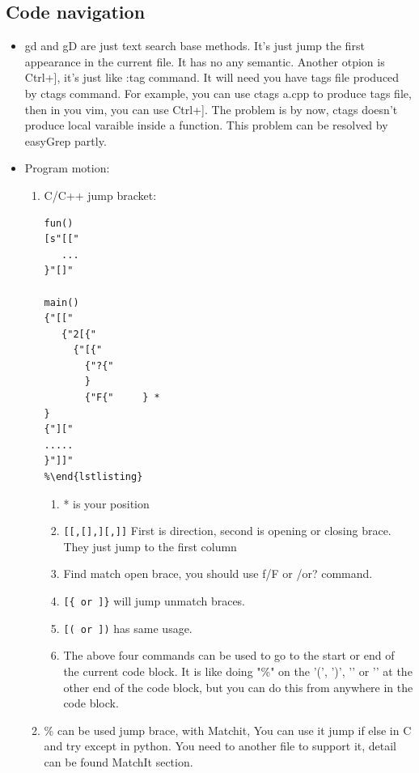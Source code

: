 \documentclass[a4paper,11pt,twoside]{book}
\begin{document}
\subsection{Code navigation}
\begin{itemize}
	\item gd and gD are just text search base methods. It's just jump the first appearance in the current file. It has no any semantic. Another otpion is Ctrl+], it's just like :tag command. It will need you have tags file produced by ctags command. For example, you can use ctags a.cpp to produce tags file, then in you vim, you can use Ctrl+]. The problem is by now, ctags doesn't produce local varaible inside a function.  This problem can be resolved by easyGrep partly.

	\item  Program motion:
\begin{enumerate}
 	\item C/C++ jump bracket:
\begin{verbatim}
fun()
[s"[["
   ...
}"[]"

main()
{"[["
   {"2[{"
	 {"[{" 
	   {"?{"
	   }
	   {"F{"     } *
}
{"]["
.....
}"]]"
%\end{lstlisting}
\end{verbatim}

\begin{enumerate}
		\item * is your position
		\item \verb=[[,[],][,]]= First is direction, second is opening or closing brace. They just jump to the first column
		\item Find match open brace, you should use f/F or /or? command. 
		\item \verb=[{ or ]}= will jump unmatch braces. 
		\item \verb=[( or ])= has same usage.

		\item The above four commands can be used to go to the start or end of the current code block.  It is like doing "\%" on the '(', ')', '{' or '}' at the other end of the code block, but you can do this from anywhere in the code block.
\end{enumerate}

\item \% can be used jump brace, with Matchit, You can use it jump if else in C and try except in python. You need to another file to support it, detail can be found MatchIt section. 


\end{enumerate}
\end{itemize}
\end{document}
